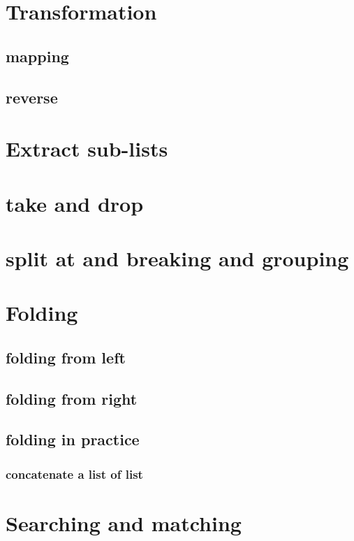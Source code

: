 \documentclass{article}
\begin{document}
\section{Transformation}

\subsection{mapping}

\subsection{reverse}

\section{Extract sub-lists}

\section{take and drop}

\section{split at and breaking and grouping}

\section{Folding}

\subsection{folding from left}

\subsection{folding from right}

\subsection{folding in practice}

\subsubsection{concatenate a list of list}

\section{Searching and matching}
\end{document}
